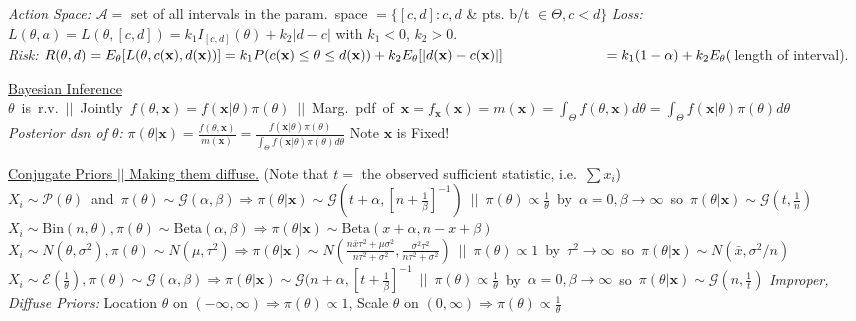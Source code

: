 \documentclass[11pt]{article}
\newcommand{\vecx}{\ensuremath{\mathbf{x}}}
\newcommand{\act}{\ensuremath{\mathcal{A}}} %
\begin{document}
%
\hspace*{1.5em}\textsl{Action Space:} $\act =$ set of all  intervals in the param.\
space $=
\{[c,d]:c,d$ \& pts. b/t $\in\Theta , c<d\}$
%
\hspace*{1.5em}\textsl{Loss:} $L(\theta,a) = L(\theta,[c,d])= k_1I_{[c,d]}(\theta) + k_2|d-c|$ with
$k_1<0$, $k_2>0$.\\
%
\hspace*{1.5em}\textsl{Risk:} $R(\theta,d) = E_\theta[L(\theta,c(\vecx),d(\vecx))] =
k_1P(c(\vecx)\leq\theta\leq d(\vecx)) + k_2E_\theta[|d(\vecx)-c(\vecx)|]\\
\hspace*{7.17em}= k_1(1-\alpha) + k_2E_\theta($length of interval).

\indent\underline{Bayesian Inference}\\
\mbox{$\theta$ is r.v.\ $||$ Jointly $f(\theta,\vecx)= f(\vecx|\theta)\pi(\theta)$ $||$
Marg.\ pdf of $\vecx = f_\vecx(\vecx) = m(\vecx) =\int_\Theta f(\theta,\vecx)d\theta =
\int_\Theta f(\vecx|\theta)\pi(\theta)d\theta$}\\
%
{\it Posterior dsn of $\theta$:}  $\pi(\theta|\vecx) = \frac{f(\theta,\vecx)}{m(\vecx)} =
\frac{f(\vecx|\theta)\pi(\theta)}{\int_\Theta f(\vecx|\theta)\pi(\theta)d\theta}$ \hspace{1em}
Note $\vecx$ is Fixed!

\indent\underline{Conjugate Priors $||$ Making them diffuse.} (Note that $t=$ the observed
sufficient statistic, i.e.\ $\sum x_i$)\\
%
\indent \mbox{$X_i\sim\mathcal{P}(\theta)$ and $\pi(\theta)\sim\mathcal{G}(\alpha,\beta)
\Longrightarrow \pi(\theta|\vecx)\sim \mathcal{G}(t+\alpha,[n+\frac{1}{\beta}]^{-1})$ $||$
$\pi(\theta)\propto\frac{1}{\theta}$ by $\alpha=0,\beta\rightarrow\infty$ so
$\pi(\theta|\vecx)\sim\mathcal{G}(t,\frac{1}{n})$}
%
\indent $X_i\sim\mathrm{Bin}(n,\theta), \pi(\theta)\sim\mathrm{Beta}(\alpha,\beta)
\Longrightarrow 
\pi(\theta|\vecx)\sim\mathrm{Beta}(x+\alpha, n-x+\beta)$\\
%
\indent \mbox{$X_i\sim N(\theta,\sigma^2), \pi(\theta)\sim N(\mu,\tau^2) \Longrightarrow
\pi(\theta|\vecx)\sim N\left(\frac{n\bar{x}\tau^2 + \mu\sigma^2}{n\tau^2+\sigma^2},
\frac{\sigma^2 \tau^2}{n\tau^2 + \sigma^2}\right)$ $||$ $\pi(\theta)\propto 1$ by
$\tau^2\rightarrow\infty$ so $\pi(\theta|\vecx)\sim N(\bar{x}, \sigma^2/n)$}\\
%
\indent\mbox{$X_i\sim\mathcal{E}(\frac{1}{\theta}), \pi(\theta)\sim
\mathcal{G}(\alpha,\beta)\Longrightarrow \pi(\theta|\vecx)\sim \mathcal{G}(n+\alpha,
[t+\frac{1}{\beta}]^{-1}$ $||$ $\pi(\theta)\propto\frac{1}{\theta}$ by
$\alpha=0,\beta\rightarrow\infty$ so
$\pi(\theta|\vecx)\sim\mathcal{G}(n,\frac{1}{t})$}
%
{\it Improper, Diffuse Priors:} Location $\theta$ on $(-\infty,\infty) \Longrightarrow
\pi(\theta)\propto 1$, Scale
$\theta$ on $(0,\infty)
\Longrightarrow \pi(\theta)\propto \frac{1}{\theta}$
\end{document}
